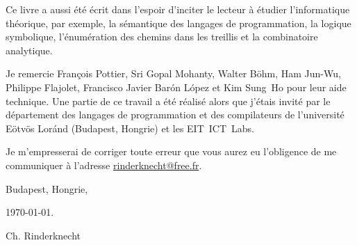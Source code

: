 Ce livre a aussi été écrit dans l'espoir d'inciter le lecteur à
étudier l'informatique théorique, par exemple, la sémantique des
langages de programmation, la logique symbolique, l'énumération des
chemins dans les treillis et la combinatoire analytique.

Je remercie Fran\c{c}ois Pottier, Sri Gopal Mohanty, Walter B\"ohm,
Ham Jun-Wu, Philippe Flajolet, Francisco Javier Bar\'on L\'opez et\!
Kim Sung~Ho pour leur aide technique. Une partie de ce travail a été
réalisé alors que j'étais invité par le département des langages de
programmation et des compilateurs de l'université E\"otv\"os Lor\'and
(Budapest, Hongrie) et les EIT~ICT~Labs.

Je m'empresserai de corriger toute erreur que vous aurez eu l'obligence de me communiquer à l'adresse \url{rinderknecht@free.fr}.

\bigskip

\hfill{}Budapest, Hongrie,

\hfill\today.

\hfill{}Ch. Rinderknecht
